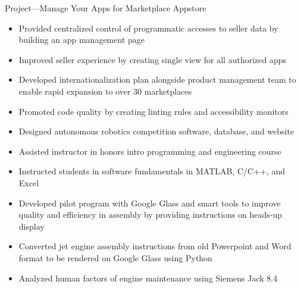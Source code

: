 \documentclass[11pt,letterpaper,ragged2e,withhyper]{altacv}
\newif\ifbubbles
\begin{document}
\begin{paracol}{2}
\par Project—Manage Your Apps for Marketplace Appstore
\smallskip
\begin{itemize}
    \item Provided centralized control of programmatic accesses to seller data by \linebreak building an app management page
    \item Improved seller experience by creating single view for all authorized apps
    \item Developed internationalization plan alongside product management team to enable rapid expansion to over 30 marketplaces
    \item Promoted code quality by creating linting rules and accessibility monitors
\end{itemize}

\ifbubbles
    \cvtag{TypeScript}
    \cvtag{Java}
    \cvtag{React}
    \cvtag{Redux}
    \cvtag{Jest}
    \cvtag{Enzyme}
    \cvtag{REST}
    \cvtag{i18next}
\fi

\divider

\begin{itemize}
    \item Designed autonomous robotics competition software, database, and website
    \item Assisted instructor in honors intro programming and engineering course
    \item Instructed students in software fundamentals in MATLAB, C/C++, and Excel
\end{itemize}

\ifbubbles
    \cvtag{Education}
    \cvtag{C}
    \cvtag{C++}
    \cvtag{MATLAB}
    \cvtag{Excel}
    \cvtag{C\#}
    \cvtag{ASP.NET}
    \cvtag{SQL}
\fi

\divider

\begin{itemize}
    \item Developed pilot program with Google Glass and smart tools to improve quality and efficiency in assembly by providing instructions on heads-up display
    \item Converted jet engine assembly instructions from old Powerpoint and Word format to be rendered on Google Glass using Python
    \item Analyzed human factors of engine maintenance using Siemens Jack 8.4
\end{itemize}


\end{paracol}
\end{document}
